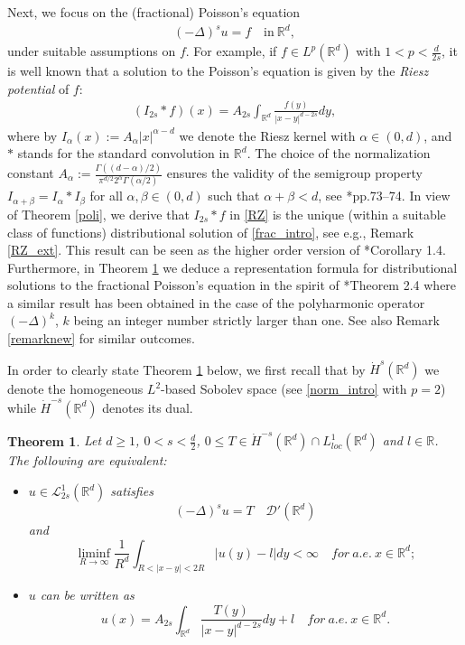 \documentclass[letterpaper, 11pt,  reqno]{amsart}
\newtheorem{theorem}{Theorem}[section]
\theoremstyle{definition}
\theoremstyle{remark}
\numberwithin{equation}{section}
\newcommand{\R}{{\mathbb R}}
\begin{document}
 Next, we focus on the (fractional) Poisson's equation 
\begin{align}
(-\Delta)^{s}u=f\quad  \text{in}\ \R^d,
\label{frac_intro}
\end{align}
under suitable assumptions on $f$. For example, if $f\in L^{p}(\R^d)$ with $1<p<\tfrac{d}{2s}$, it is well known that a solution to the Poisson's equation is given by the \textit{Riesz potential} of $f$: 
 \begin{align}\label{RZ}
 (I_{2s}*f)(x)=A_{2s}\int_{\R^d}\frac{f(y)}{|x-y|^{d-2s}}dy, 
 \end{align}
where by $I_{\alpha}(x):=A_{\alpha}|x|^{\alpha-d}$ we denote the Riesz kernel with $\alpha\in (0,d)$, and $*$ stands for the standard convolution in $\R^d$. The choice of the normalization constant $A_{\alpha}{:=\!\frac{\Gamma((d-\alpha)/2)}{\pi^{d/2}2^{\alpha}\Gamma(\alpha/2)}}$
ensures the validity of the semigroup property $I_{\alpha+\beta}=I_\alpha*I_\beta$ for all $\alpha,\beta\in(0,d)$ such that $\alpha+\beta<d$, see \cite{DuPlessis}*{pp.\thinspace{}73--74}. 
 In view of Theorem \ref{poli},  we derive that  $I_{2s}*f$ in \eqref{RZ} is the unique (within a suitable class of functions) distributional solution  of \eqref{frac_intro}, see e.g.,  Remark \ref{RZ_ext}.
This result can be seen as the higher order version of \cite{entire}*{Corollary 1.4}.
Furthermore, in Theorem \ref{lemmamit} we deduce a representation formula for distributional solutions to the fractional Poisson's equation in the spirit of \cite{mitidieri}*{Theorem 2.4} where a similar result has been obtained in the case of the polyharmonic operator $(-\Delta)^{k}$, $k$ being an integer number strictly larger than one. See also Remark \ref{remarknew} for similar outcomes.

 In order to clearly state Theorem \ref{lemmamit} below, we first recall that by $\dot H^{s}(\R^d)$ we denote the homogeneous $L^{2}$-based Sobolev space (see \eqref{norm_intro} with $p=2$) while $\dot H^{-s}(\R^d)$ denotes its dual.
\begin{theorem}\label{lemmamit}
	Let $d\ge 1$,  $0<s<\tfrac{d}{2}$, $0 \le T\in \dot{H}^{-s}(\R^d)\cap L^{1}_{loc}(\R^d)$ and $l\in \R$. The following are equivalent:
	\begin{itemize}
		\item[$(i)$] $u\in \mathscr{L}^{1}_{2s}(\R^d)$ satisfies 
		\begin{equation*}\label{eqT}
			(-\Delta)^su=T\quad \mathscr{D}'(\R^d)
		\end{equation*}
		and
		\begin{equation}\label{eq2228}
			\liminf_{R\to \infty}\frac{1}{R^d}\int_{R<|x-y|<2R} |u(y)-l |dy<\infty\quad for\ a.e.\ x\in \R^d;
		\end{equation} 
		\item[$(ii)$] $u$ can be written as
		$$u(x)=A_{2s}\int_{\R^d}\frac{T(y)}{|x-y|^{d-2s}}dy+l\quad for\ a.e.\ x\in \R^d.$$
	\end{itemize}
\end{theorem}
\end{document}

